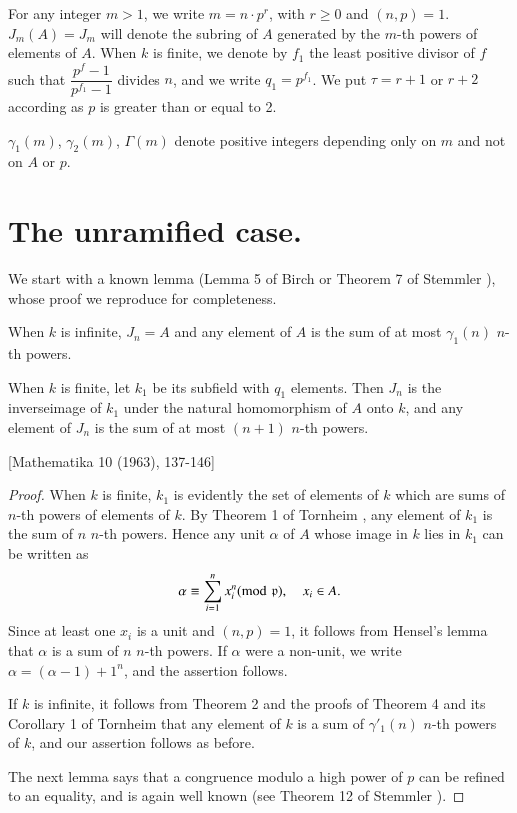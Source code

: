 For any integer $m>1$, we write $m=n \cdot p^r$, with $r \geq 0$ and $(n,p) =1$. $J_m (A) = J_m$ will denote the subring of $A$ generated by the $m$-th powers of elements of $A$. When $k$ is finite, we denote by $f_1$ the least positive divisor of $f$ such that $\dfrac{p^{f} -1}{p^{f_1} -1}$ divides $n$, and we write $q_1 = p^{f_1}$. We put $\tau = r+ 1$ or $r+2$ according as $p$ is greater than or equal to 2.

$\gamma_1 (m)$, $\gamma_2 (m)$, $\Gamma (m)$ denote positive integers depending only on $m$ and not on $A$ or $p$.

\section{The unramified case.}\label{art5-sec1}
 We start with a known lemma (Lemma 5 of Birch \cite{art5-key1} or Theorem 7 of Stemmler \cite{art5-key4}), whose proof we reproduce for completeness.

\begin{lem}\label{art5-lem1}
When $k$ is infinite, $J_n = A$ and any element of $A$ is the sum of at most $\gamma_1 (n)$ $n$-th powers.

When $k$ is finite, let $k_1$ be its subfield with $q_1$ elements. Then $J_n$ is the
inverse\pageoriginale image of $k_1$ under the natural homomorphism of $A$ onto $k$, and any element of $J_n$ is the sum of at most $(n+1)$ $n$-th powers.
\end{lem}
\begin{center}
 [Mathematika 10 (1963), 137-146]
\end{center}

\begin{proof}
When $k$ is finite, $k_1$ is evidently the set of elements of $k$ which are sums of $n$-th powers of elements of $k$. By Theorem 1 of Tornheim \cite{art5-key5}, any element of $k_1$ is the sum of $n$ $n$-th powers. Hence any unit $\alpha$ of $A$ whose image in $k$ lies in $k_1$ can be written as
$$
\alpha \equiv \sum\limits^n_{i=1} x^n_i ({\rm{mod}}\kern.3em \mathfrak{p}), \quad x_i \in A.
$$
Since at least one $x_i$ is a unit and $(n,p) =1$, it follows from Hensel's lemma that $\alpha$ is a sum of $n$ $n$-th powers. If $\alpha$ were a non-unit, we write $\alpha = (\alpha -1) + 1^n$, and the assertion follows.

If $k$ is infinite, it follows from Theorem 2 and the proofs of Theorem 4 and its Corollary 1 of Tornheim \cite{art5-key5} that any element of $k$ is a sum of $\gamma'_1 (n)$ $n$-th powers of $k$, and our assertion follows as before.

The next lemma says that a congruence modulo a high power of $p$ can be refined to an equality, and is again well known (see Theorem 12 of Stemmler \cite{art5-key4}).
\end{proof}

